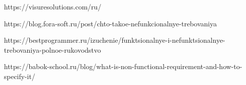 \renewcommand{\section}[2]{\anonsection{Библиографический список}}




\label{sec:bibliography}

https://visuresolutions.com/ru/%

https://blog.fora-soft.ru/post/chto-takoe-nefunkcionalnye-trebovaniya

https://bestprogrammer.ru/izuchenie/funktsionalnye-i-nefunktsionalnye-trebovaniya-polnoe-rukovodstvo

https://babok-school.ru/blog/what-is-non-functional-requirement-and-how-to-specify-it/



\clearpage